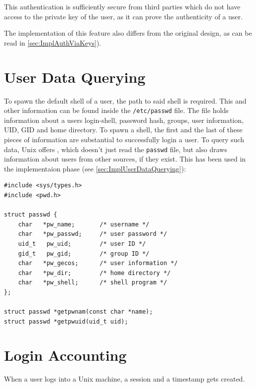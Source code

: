 \documentclass[10pt,a4paper,titlepage,twoside,english,final]{zhawreprt}
\begin{document}
This authentication is sufficiently secure from third parties which do not have access to the private key of the user, as it can prove the authenticity of a user.

The implementation of this feature also differs from the original design, as can be read in \ref{sec:ImplAuthViaKeys}).

\section{User Data Querying}\label{sec:DesignUserDataQuerying}
To spawn the default \gls{shell} of a user, the path to said \gls{shell} is required.
This and other information can be found inside the \texttt{/etc/passwd} file.
The file holds information about a users login-\gls{shell}, password hash, groups, user information, \gls{UID}, \gls{GID} and home directory.
To spawn a \gls{shell}, the first and the last of these pieces of information are substantial to successfully login a user.
To query such data, \gls{Unix} offers \cite{getpw}, which doesn't just read the \texttt{passwd} file, but also draws information about users from other sources, if they exist.
This has been used in the implementaion phase (see \ref{sec:ImplUserDataQuerying}):
\setlistingC
\begin{lstlisting}[caption={Definition of passwd and {\cite{getpw}}},label=lst:PasswdDefinition]
#include <sys/types.h>
#include <pwd.h>

struct passwd {
	char   *pw_name;       /* username */
	char   *pw_passwd;     /* user password */
	uid_t   pw_uid;        /* user ID */
	gid_t   pw_gid;        /* group ID */
	char   *pw_gecos;      /* user information */
	char   *pw_dir;        /* home directory */
	char   *pw_shell;      /* shell program */
};

struct passwd *getpwnam(const char *name);
struct passwd *getpwuid(uid_t uid);
\end{lstlisting}

\section{Login Accounting}\label{sec:DesignLoginAccounting}
When a user logs into a \gls{Unix} machine, a session and a timestamp gets created.
\end{document}
